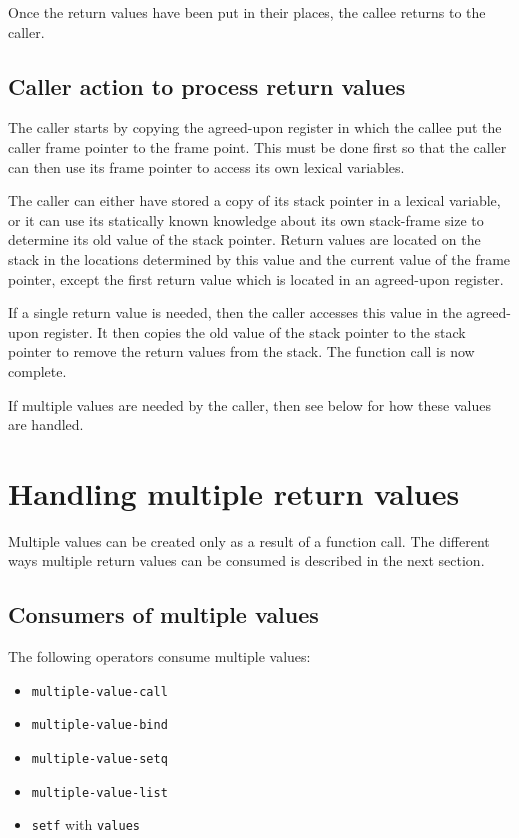 Once the return values have been put in their places, the callee
returns to the caller.

\subsection{Caller action to process return values}

The caller starts by copying the agreed-upon register in which the
callee put the caller frame pointer to the frame point.  This must be
done first so that the caller can then use its frame pointer to access
its own lexical variables.

The caller can either have stored a copy of its stack pointer in a
lexical variable, or it can use its statically known knowledge about
its own stack-frame size to determine its old value of the stack
pointer.  Return values are located on the stack in the locations
determined by this value and the current value of the frame pointer,
except the first return value which is located in an agreed-upon
register.

If a single return value is needed, then the caller accesses this
value in the agreed-upon register.  It then copies the old value of
the stack pointer to the stack pointer to remove the return values
from the stack.  The function call is now complete.

If multiple values are needed by the caller, then see below for how
these values are handled.

\section{Handling multiple return values}

Multiple values can be created only as a result of a function call.
The different ways multiple return values can be consumed is described
in the next section.

\subsection{Consumers of multiple values}

The following operators consume multiple values:

\begin{itemize}
\item \texttt{multiple-value-call}
\item \texttt{multiple-value-bind}
\item \texttt{multiple-value-setq}
\item \texttt{multiple-value-list}
\item \texttt{setf} with \texttt{values}
\end{itemize}

